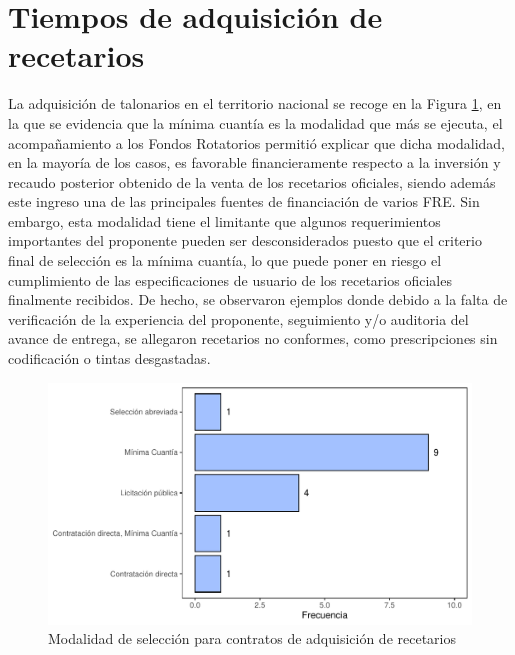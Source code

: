 \documentclass[
]{book}
\begin{document}
\hypertarget{tiempos-de-adquisiciuxf3n-de-recetarios}{%
\section{Tiempos de adquisición de recetarios}\label{tiempos-de-adquisiciuxf3n-de-recetarios}}


La adquisición de talonarios en el territorio nacional se recoge en la Figura \ref{fig:modalidadAdquisicion}, en la que se evidencia que la mínima cuantía es la modalidad que más se ejecuta, el acompañamiento a los Fondos Rotatorios permitió explicar que dicha modalidad, en la mayoría de los casos, es favorable financieramente respecto a la inversión y recaudo posterior obtenido de la venta de los recetarios oficiales, siendo además este ingreso una de las principales fuentes de financiación de varios FRE. Sin embargo, esta modalidad tiene el limitante que algunos requerimientos importantes del proponente pueden ser desconsiderados puesto que el criterio final de selección es la mínima cuantía, lo que puede poner en riesgo el cumplimiento de las especificaciones de usuario de los recetarios oficiales finalmente recibidos. De hecho, se observaron ejemplos donde debido a la falta de verificación de la experiencia del proponente, seguimiento y/o auditoria del avance de entrega, se allegaron recetarios no conformes, como prescripciones sin codificación o tintas desgastadas.

\begin{figure}
\includegraphics[width=0.85\linewidth]{InformeFinal_files/figure-latex/modalidadAdquisicion-1} \caption{Modalidad de selección para contratos de adquisición de recetarios}\label{fig:modalidadAdquisicion}
\end{figure}
\end{document}
